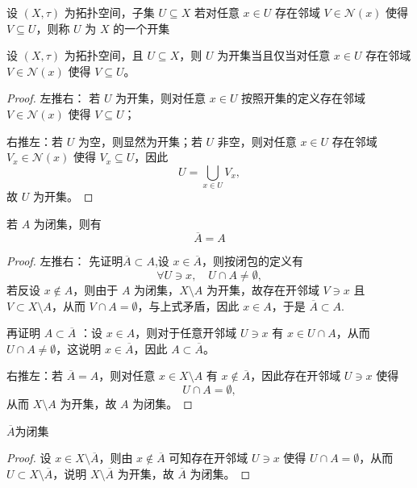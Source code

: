 \documentclass[lang=cn,a4paper,newtx,figureplace=section,tableplace=section]{elegantbook}
\begin{document}
\begin{definition}[开集]\label{def:open_set}设 $(X,\tau)$ 为拓扑空间，子集 $U\subseteq X$ 若对任意 $x\in U$ 存在邻域 $V\in\mathcal{N}(x)$ 使得 $V\subseteq U$，则称 $U$ 为 $X$ 的一个开集
\end{definition}

\begin{proposition}设 $(X,\tau)$ 为拓扑空间，且 $U\subseteq X$，则 $U$ 为开集当且仅当对任意 $x\in U$ 存在邻域 $V\in\mathcal{N}(x)$ 使得 $V\subseteq U$。 \end{proposition}
\begin{proof}
    左推右：
    若 $U$ 为开集，则对任意 $x\in U$ 按照开集的定义存在邻域 $V\in\mathcal{N}(x)$ 使得 $V\subseteq U$；
    
    右推左：若 $U$ 为空，则显然为开集；若 $U$ 非空，则对任意 $x\in U$ 存在邻域 $V_x\in\mathcal{N}(x)$ 使得 $V_x\subseteq U$，因此
\begin{equation}
U=\bigcup_{x\in U}V_x,
\end{equation}
故 $U$ 为开集。
\end{proof}

\begin{proposition}
若 $A$ 为闭集，则有
\begin{equation}
\overline{A}=A
\end{equation}
\end{proposition}
\begin{proof}
左推右：
    先证明$\overline{A}\subset A$,设 $x\in\overline{A}$，则按闭包的定义有
\begin{equation}
\forall U\ni x,\quad U\cap A\neq\emptyset,
\end{equation}
若反设 $x\notin A$，则由于 $A$ 为闭集，$X\setminus A$ 为开集，故存在开邻域 $V\ni x$ 且 $V\subset X\setminus A$，从而 $V\cap A=\emptyset$，与上式矛盾，因此 $x\in A$，于是 $\overline{A}\subset A$.

再证明
$A\subset\overline{A}$
：设 $x\in A$，则对于任意开邻域 $U\ni x$ 有 $x\in U\cap A$，从而 $U\cap A\neq\emptyset$，这说明 $x\in\overline{A}$，因此 $A\subset\overline{A}$。

右推左：若 $\overline{A}=A$，则对任意 $x\in X\setminus A$ 有 $x\notin\overline{A}$，因此存在开邻域 $U\ni x$ 使得
\begin{equation}
U\cap A=\emptyset,
\end{equation}
从而 $X\setminus A$ 为开集，故 $A$ 为闭集。
\end{proof}
\begin{proposition}
    $\overline{A}$为闭集
\end{proposition}
\begin{proof}
    设 $x\in X\setminus\overline{A}$，则由 $x\notin\overline{A}$ 可知存在开邻域 $U\ni x$ 使得 $U\cap A=\emptyset$，从而 $U\subset X\setminus\overline{A}$，说明 $X\setminus\overline{A}$ 为开集，故 $\overline{A}$ 为闭集。
\end{proof}
\end{document}
